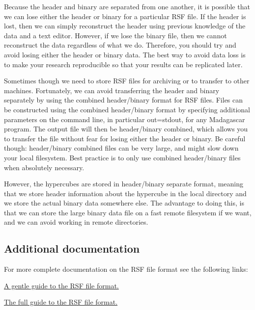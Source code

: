 Because the header and binary are separated from one another, it is possible that we can lose either the header or binary for a particular RSF file.  If the header is lost, then we can simply reconstruct the header using previous knowledge of the data and a text editor.  However, if we lose the binary file, then we cannot reconstruct the data regardless of what we do.  Therefore, you should try and avoid losing either the header or binary data.  The best way to avoid data loss is to make your research reproducible so that your results can be replicated later.

Sometimes though we need to store RSF files for archiving or to transfer to other machines.  Fortunately, we can avoid transferring the header and binary separately by using the combined header/binary format for RSF files.  Files can be constructed using the combined header/binary format by specifying additional parameters on the command line, in particular out=stdout, for any Madagascar program.  The output file will then be header/binary combined, which allows you to transfer the file without fear for losing either the header or binary.  Be careful though: header/binary combined files can be very large, and might slow down your local filesystem.  Best practice is to only use combined header/binary files when absolutely necessary.  


However, the hypercubes are stored in header/binary separate format, meaning that we store header information about the hypercube in the local directory and we store the actual binary data somewhere else.  The advantage to doing this, is that we can store the large binary data file on a fast remote filesystem if we want, and we can avoid working in remote directories.  

\subsection{Additional documentation}

For more complete documentation on the RSF file format see the following links:

\href{http://reproducibility.org/wiki/Guide_to_RSF_file_format}{A gentle guide to the RSF file format.}

\href{http://reproducibility.org/wiki/RSF_Comprehensive_Description}{The full guide to the RSF file format.}

